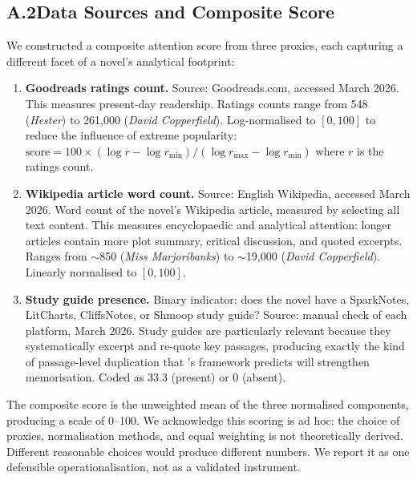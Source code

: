 \subsection*{A.2\quad Data Sources and Composite Score}

We constructed a composite attention score from three proxies, each
capturing a different facet of a novel's analytical footprint:

\begin{enumerate}[leftmargin=2em]

\item \textbf{Goodreads ratings count.}  Source: Goodreads.com, accessed
March 2026.  This measures present-day readership.
Ratings counts range from 548 (\emph{Hester}) to 261,000
(\emph{David Copperfield}).  Log-normalised to $[0, 100]$ to reduce
the influence of extreme popularity:
$\mathrm{score} = 100 \times (\log r - \log r_{\min}) / (\log r_{\max} - \log r_{\min})$
where $r$ is the ratings count.

\item \textbf{Wikipedia article word count.}  Source: English Wikipedia,
accessed March 2026.  Word count of the novel's Wikipedia article,
measured by selecting all text content.  This measures encyclopaedic
and analytical attention: longer articles contain more plot summary,
critical discussion, and quoted excerpts.  Ranges from $\sim$850
(\emph{Miss Marjoribanks}) to $\sim$19,000 (\emph{David
Copperfield}).  Linearly normalised to $[0, 100]$.

\item \textbf{Study guide presence.}  Binary indicator: does the novel
have a SparkNotes, LitCharts, CliffsNotes, or Shmoop study guide?
Source: manual check of each platform, March 2026.  Study guides are
particularly relevant because they systematically excerpt and re-quote
key passages, producing exactly the kind of passage-level duplication
that \textcite{carlini2023quantifying}'s framework predicts will
strengthen memorisation.  Coded as 33.3 (present) or 0 (absent).
\end{enumerate}

The composite score is the unweighted mean of the three normalised
components, producing a scale of 0--100.  We acknowledge this scoring
is ad hoc: the choice of proxies, normalisation methods, and equal
weighting is not theoretically derived.  Different reasonable choices
would produce different numbers.  We report it as one defensible
operationalisation, not as a validated instrument.

